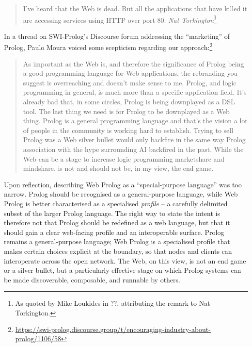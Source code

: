 \begin{quotation}
I've heard that the Web is dead. But all the applications that have killed it are accessing services using HTTP over port 80.  
\vspace{-0.3cm}
\flushright\textit{Nat Torkington}\footnote{As quoted by Mike Loukides in ??, attributing the remark to Nat Torkington.}
\end{quotation}

\noindent In a thread on SWI-Prolog's Discourse forum addressing the ``marketing'' of Prolog, Paulo Moura voiced some scepticism regarding our approach:\footnote{\url{https://swi-prolog.discourse.group/t/encouraging-industry-about-prolog/1106/58}}

\begin{quotation}
As important as the Web is, and therefore the significance of Prolog being a good programming language for Web applications, the rebranding you suggest is overreaching and doesn't make sense to me. Prolog, and logic programming in general, is much more than a specific application field. It's already bad that, in some circles, Prolog is being downplayed as a DSL tool. The last thing we need is for Prolog to be downplayed as a Web thing. Prolog is a general programming language and that's the vision a lot of people in the community is working hard to establish. Trying to sell Prolog was a Web silver bullet would only backfire in the same way Prolog association with the hype surrounding AI backfired in the past. While the Web can be a stage to increase logic programming marketshare and mindshare, is not and should not be, in my view, the end game.
\end{quotation}

\noindent %
Upon reflection, describing Web Prolog as a ``special-purpose language'' was too narrow. Prolog should be recognised as a general-purpose language, while Web Prolog is better characterised as a specialised \textit{profile} -- a carefully delimited subset of the larger Prolog language. The right way to state the intent is therefore not that Prolog should be redefined as a web language, but that it should gain a clear web-facing profile and an interoperable surface. Prolog remains a general-purpose language; Web Prolog is a specialised profile that makes certain choices explicit at the boundary, so that nodes and clients can interoperate across the open network. The Web, on this view, is not an end game or a silver bullet, but a particularly effective stage on which Prolog systems can be made discoverable, composable, and runnable by others.

